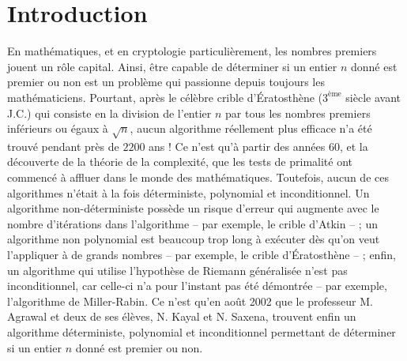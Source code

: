 \documentclass[11pt]{article}
\begin{document}
\newpage


\section*{Introduction}

En mathématiques, et en cryptologie particulièrement, les nombres premiers jouent un rôle capital. Ainsi, être capable de déterminer si un entier $n$ donné est premier ou non est un problème qui passionne depuis toujours les mathématiciens. Pourtant, après le célèbre crible d'Ératosthène ($3^{\text{ème}}$ siècle avant J.C.) qui consiste en la division de l'entier $n$ par tous les nombres premiers inférieurs ou égaux à $\sqrt{n}$, aucun algorithme réellement plus efficace n'a été trouvé pendant près de $2200$ ans ! Ce n'est qu'à partir des années 60, et la découverte de la théorie de la complexité, que les tests de primalité ont commencé à affluer dans le monde des mathématiques. Toutefois, aucun de ces algorithmes n'était à la fois déterministe, polynomial et inconditionnel. Un algorithme non-déterministe possède un risque d'erreur qui augmente avec le nombre d'itérations dans l'algorithme -- par exemple, le crible d'Atkin -- ; un algorithme non polynomial est beaucoup trop long à exécuter dès qu'on veut l'appliquer à de grands nombres -- par exemple, le crible d'Ératosthène -- ; enfin, un algorithme qui utilise l'hypothèse de Riemann généralisée n'est pas inconditionnel, car celle-ci n'a pour l'instant pas été démontrée -- par exemple, l'algorithme de Miller-Rabin. Ce n'est qu'en août 2002 que le professeur M. Agrawal et deux de ses élèves, N. Kayal et N. Saxena, trouvent enfin un algorithme déterministe, polynomial et inconditionnel permettant de déterminer si un entier $n$ donné est premier ou non.\\
\end{document}
